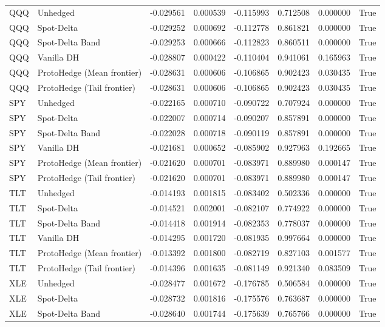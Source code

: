 \begin{tabular}{llrrrrrr}
QQQ & Unhedged & -0.029561 & 0.000539 & -0.115993 & 0.712508 & 0.000000 & True \\
QQQ & Spot-Delta & -0.029252 & 0.000692 & -0.112778 & 0.861821 & 0.000000 & True \\
QQQ & Spot-Delta Band & -0.029253 & 0.000666 & -0.112823 & 0.860511 & 0.000000 & True \\
QQQ & Vanilla DH & -0.028807 & 0.000422 & -0.110404 & 0.941061 & 0.165963 & True \\
QQQ & ProtoHedge (Mean frontier) & -0.028631 & 0.000606 & -0.106865 & 0.902423 & 0.030435 & True \\
QQQ & ProtoHedge (Tail frontier) & -0.028631 & 0.000606 & -0.106865 & 0.902423 & 0.030435 & True \\
SPY & Unhedged & -0.022165 & 0.000710 & -0.090722 & 0.707924 & 0.000000 & True \\
SPY & Spot-Delta & -0.022007 & 0.000714 & -0.090207 & 0.857891 & 0.000000 & True \\
SPY & Spot-Delta Band & -0.022028 & 0.000718 & -0.090119 & 0.857891 & 0.000000 & True \\
SPY & Vanilla DH & -0.021681 & 0.000652 & -0.085902 & 0.927963 & 0.192665 & True \\
SPY & ProtoHedge (Mean frontier) & -0.021620 & 0.000701 & -0.083971 & 0.889980 & 0.000147 & True \\
SPY & ProtoHedge (Tail frontier) & -0.021620 & 0.000701 & -0.083971 & 0.889980 & 0.000147 & True \\
TLT & Unhedged & -0.014193 & 0.001815 & -0.083402 & 0.502336 & 0.000000 & True \\
TLT & Spot-Delta & -0.014521 & 0.002001 & -0.082107 & 0.774922 & 0.000000 & True \\
TLT & Spot-Delta Band & -0.014418 & 0.001914 & -0.082353 & 0.778037 & 0.000000 & True \\
TLT & Vanilla DH & -0.014295 & 0.001720 & -0.081935 & 0.997664 & 0.000000 & True \\
TLT & ProtoHedge (Mean frontier) & -0.013392 & 0.001800 & -0.082719 & 0.827103 & 0.001577 & True \\
TLT & ProtoHedge (Tail frontier) & -0.014396 & 0.001635 & -0.081149 & 0.921340 & 0.083509 & True \\
XLE & Unhedged & -0.028477 & 0.001672 & -0.176785 & 0.506584 & 0.000000 & True \\
XLE & Spot-Delta & -0.028732 & 0.001816 & -0.175576 & 0.763687 & 0.000000 & True \\
XLE & Spot-Delta Band & -0.028640 & 0.001744 & -0.175639 & 0.765766 & 0.000000 & True \\

\end{tabular}
